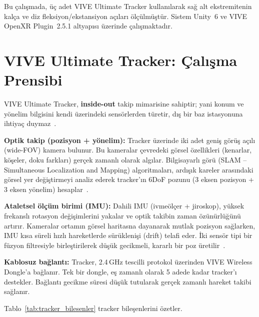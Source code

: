 \documentclass[11pt,a4paper]{article}
\begin{document}
Bu \c{c}al{\i}\c{s}mada, \"u\c{c} adet VIVE Ultimate Tracker kullan{\i}larak sa\u{g} alt
ekstremitenin kal\c{c}a ve diz fleksiyon/ekstansiyon a\c{c}{\i}lar{\i}
\"ol\c{c}\"ulm\"u\c{s}t\"ur. Sistem Unity~6 ve VIVE OpenXR Plugin~2.5.1 altyap{\i}s{\i}
\"uzerinde \c{c}al{\i}\c{s}maktad{\i}r.

\section{VIVE Ultimate Tracker: \c{C}al{\i}\c{s}ma Prensibi}
\label{sec:tracker}

VIVE Ultimate Tracker, \textbf{inside-out} takip mimarisine sahiptir;
yani konum ve y\"onelim bilgisini kendi \"uzerindeki sens\"orlerden
t\"uretir, d{\i}\c{s} bir baz istasyonuna ihtiya\c{c} duymaz~\cite{htcvive2024}.

\textbf{Optik takip (pozisyon + y\"onelim):}
Tracker \"uzerinde iki adet geni\c{s} g\"or\"u\c{s} a\c{c}{\i}l{\i} (wide-FOV) kamera
bulunur. Bu kameralar \c{c}evredeki g\"orsel \"ozellikleri (kenarlar,
k\"o\c{s}eler, doku farklar{\i}) ger\c{c}ek zamanl{\i} olarak alg{\i}lar. Bilgisayarl{\i}
g\"or\"u (SLAM -- Simultaneous Localization and Mapping) algoritmalar{\i},
ard{\i}\c{s}{\i}k kareler aras{\i}ndaki g\"orsel yer de\u{g}i\c{s}tirmeyi analiz ederek
tracker'{\i}n 6DoF pozunu (3 eksen pozisyon + 3 eksen y\"onelim)
hesaplar~\cite{cadena2016}.

\textbf{Ataletsel \"ol\c{c}\"um birimi (IMU):}
Dahili IMU (ivme\"ol\c{c}er + jiroskop), y\"uksek frekansl{\i} rotasyon
de\u{g}i\c{s}imlerini yakalar ve optik takibin zaman \"oz\"un\"url\"u\u{g}\"un\"u
art{\i}r{\i}r. Kameralar ortam{\i}n g\"orsel haritasna dayanarak mutlak
pozisyon sa\u{g}larken, IMU k{\i}sa s\"ureli h{\i}zl{\i} hareketlerde
s\"ur\"ukleni\c{s}i (drift) telafi eder. \.Iki sens\"or tipi bir f\"uzyon
filtresiyle birle\c{s}tirilerek d\"u\c{s}\"uk gecikmeli, kararl{\i} bir poz
\"uretilir~\cite{seel2014}.

\textbf{Kablosuz ba\u{g}lant{\i}:}
Tracker, 2.4\,GHz tescilli protokol \"uzerinden VIVE Wireless Dongle'a
ba\u{g}lan{\i}r. Tek bir dongle, e\c{s} zamanl{\i} olarak 5 adede kadar
tracker'{\i} destekler. Ba\u{g}lant{\i} gecikme s\"uresi d\"u\c{s}\"uk tutularak
ger\c{c}ek zamanl{\i} hareket takibi sa\u{g}lan{\i}r.

Tablo~\ref{tab:tracker_bilesenler} tracker bile\c{s}enlerini \"ozetler.
\end{document}
